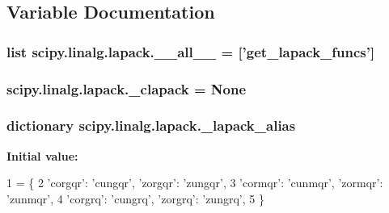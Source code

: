 \subsection{Variable Documentation}
\hypertarget{namespacescipy_1_1linalg_1_1lapack_a12a4b3c5178a989c5ae8795d9289d56f}{}
\subsubsection[{\+\_\+\+\_\+all\+\_\+\+\_\+}]{\setlength{\rightskip}{0pt plus 5cm}list scipy.\+linalg.\+lapack.\+\_\+\+\_\+all\+\_\+\+\_\+ = \mbox{[}'{\bf get\+\_\+lapack\+\_\+funcs}'\mbox{]}}\label{namespacescipy_1_1linalg_1_1lapack_a12a4b3c5178a989c5ae8795d9289d56f}
\hypertarget{namespacescipy_1_1linalg_1_1lapack_a3de85b688648163863b95f0cf3140684}{}
\subsubsection[{\+\_\+clapack}]{\setlength{\rightskip}{0pt plus 5cm}scipy.\+linalg.\+lapack.\+\_\+clapack = None}\label{namespacescipy_1_1linalg_1_1lapack_a3de85b688648163863b95f0cf3140684}
\hypertarget{namespacescipy_1_1linalg_1_1lapack_abbd091887d94ed9be4fa4cd758a750e7}{}
\subsubsection[{\+\_\+lapack\+\_\+alias}]{\setlength{\rightskip}{0pt plus 5cm}dictionary scipy.\+linalg.\+lapack.\+\_\+lapack\+\_\+alias}\label{namespacescipy_1_1linalg_1_1lapack_abbd091887d94ed9be4fa4cd758a750e7}
{\bfseries Initial value\+:}
\begin{DoxyCode}
1 = \{
2     \textcolor{stringliteral}{'corgqr'}: \textcolor{stringliteral}{'cungqr'}, \textcolor{stringliteral}{'zorgqr'}: \textcolor{stringliteral}{'zungqr'},
3     \textcolor{stringliteral}{'cormqr'}: \textcolor{stringliteral}{'cunmqr'}, \textcolor{stringliteral}{'zormqr'}: \textcolor{stringliteral}{'zunmqr'},
4     \textcolor{stringliteral}{'corgrq'}: \textcolor{stringliteral}{'cungrq'}, \textcolor{stringliteral}{'zorgrq'}: \textcolor{stringliteral}{'zungrq'},
5 \}
\end{DoxyCode}
\hypertarget{namespacescipy_1_1linalg_1_1lapack_ab8070c754e34b5dfbe3a165fca04aaa5}{}

